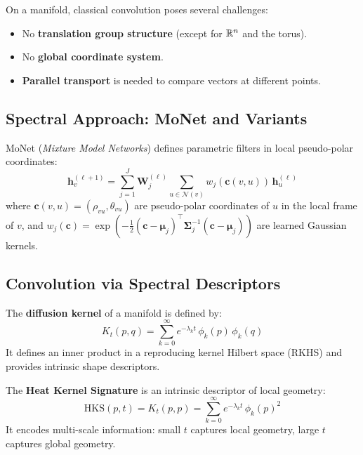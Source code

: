 On a manifold, classical convolution poses several challenges:
\begin{itemize}
    \item No \textbf{translation group structure} (except for $\mathbb{R}^n$ and the torus).
    \item No \textbf{global coordinate system}.
    \item \textbf{Parallel transport} is needed to compare vectors at different points.
\end{itemize}

\subsection{Spectral Approach: MoNet and Variants}

\begin{definition}
MoNet (\textit{Mixture Model Networks}) defines parametric filters in local
pseudo-polar coordinates:
\[
    \mathbf{h}_v^{(\ell+1)} = \sum_{j=1}^{J} \mathbf{W}_j^{(\ell)}
    \sum_{u \in \mathcal{N}(v)} w_j(\mathbf{c}(v, u))\, \mathbf{h}_u^{(\ell)}
\]
where $\mathbf{c}(v, u) = (\rho_{vu}, \theta_{vu})$ are pseudo-polar
coordinates of $u$ in the local frame of $v$, and
$w_j(\mathbf{c}) = \exp\!\left(-\frac{1}{2}(\mathbf{c} - \boldsymbol{\mu}_j)^\top
\boldsymbol{\Sigma}_j^{-1}(\mathbf{c} - \boldsymbol{\mu}_j)\right)$
are learned Gaussian kernels.
\end{definition}

\subsection{Convolution via Spectral Descriptors}

\begin{definition}
The \textbf{diffusion kernel} of a manifold is defined by:
\[
    K_t(p, q) = \sum_{k=0}^{\infty} e^{-\lambda_k t}\, \phi_k(p)\, \phi_k(q)
\]
It defines an inner product in a reproducing kernel Hilbert space (RKHS) and
provides intrinsic shape descriptors.
\end{definition}

\begin{definition}
The \textbf{Heat Kernel Signature} is an intrinsic descriptor of local geometry:
\[
    \mathrm{HKS}(p, t) = K_t(p, p) = \sum_{k=0}^{\infty} e^{-\lambda_k t}\, \phi_k(p)^2
\]
It encodes multi-scale information: small $t$ captures local geometry, large
$t$ captures global geometry.
\end{definition}

